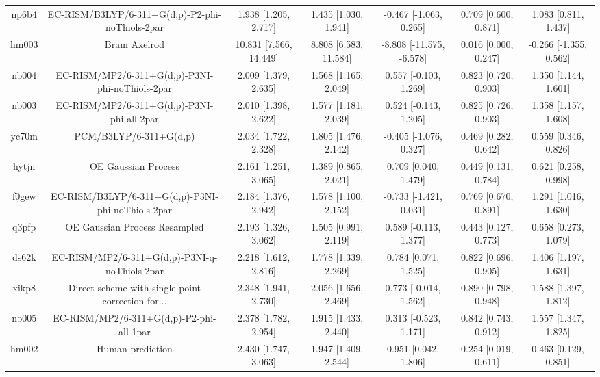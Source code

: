 \documentclass{article}
\begin{document}
\begin{center}
\begin{longtable}{|ccccccc|}
 np6b4 &    EC-RISM/B3LYP/6-311+G(d,p)-P2-phi-noThiols-2par &    1.938 [1.205, 2.717] &   1.435 [1.030, 1.941] &    -0.467 [-1.063, 0.265] &  0.709 [0.600, 0.871] &    1.083 [0.811, 1.437] \\
 hm003 &                                       Bram Axelrod &  10.831 [7.566, 14.449] &  8.808 [6.583, 11.584] &  -8.808 [-11.575, -6.578] &  0.016 [0.000, 0.247] &  -0.266 [-1.355, 0.562] \\
 nb004 &    EC-RISM/MP2/6-311+G(d,p)-P3NI-phi-noThiols-2par &    2.009 [1.379, 2.635] &   1.568 [1.165, 2.049] &     0.557 [-0.103, 1.269] &  0.823 [0.720, 0.903] &    1.350 [1.144, 1.601] \\
 nb003 &         EC-RISM/MP2/6-311+G(d,p)-P3NI-phi-all-2par &    2.010 [1.398, 2.622] &   1.577 [1.181, 2.039] &     0.524 [-0.143, 1.205] &  0.825 [0.726, 0.903] &    1.358 [1.157, 1.608] \\
 yc70m &                             PCM/B3LYP/6-311+G(d,p) &    2.034 [1.722, 2.328] &   1.805 [1.476, 2.142] &    -0.405 [-1.076, 0.327] &  0.469 [0.282, 0.642] &    0.559 [0.346, 0.826] \\
 hytjn &                                OE Gaussian Process &    2.161 [1.251, 3.065] &   1.389 [0.865, 2.021] &      0.709 [0.040, 1.479] &  0.449 [0.131, 0.784] &    0.621 [0.258, 0.998] \\
 f0gew &  EC-RISM/B3LYP/6-311+G(d,p)-P3NI-phi-noThiols-2par &    2.184 [1.376, 2.942] &   1.578 [1.100, 2.152] &    -0.733 [-1.421, 0.031] &  0.769 [0.670, 0.891] &    1.291 [1.016, 1.630] \\
 q3pfp &                      OE Gaussian Process Resampled &    2.193 [1.326, 3.062] &   1.505 [0.991, 2.119] &     0.589 [-0.113, 1.377] &  0.443 [0.127, 0.773] &    0.658 [0.273, 1.079] \\
 ds62k &      EC-RISM/MP2/6-311+G(d,p)-P3NI-q-noThiols-2par &    2.218 [1.612, 2.816] &   1.778 [1.339, 2.269] &      0.784 [0.071, 1.525] &  0.822 [0.696, 0.905] &    1.406 [1.197, 1.631] \\
 xikp8 &  Direct scheme with single point correction for... &    2.348 [1.941, 2.730] &   2.056 [1.656, 2.469] &     0.773 [-0.014, 1.562] &  0.890 [0.798, 0.948] &    1.588 [1.397, 1.812] \\
 nb005 &           EC-RISM/MP2/6-311+G(d,p)-P2-phi-all-1par &    2.378 [1.782, 2.954] &   1.915 [1.433, 2.440] &     0.313 [-0.523, 1.171] &  0.842 [0.743, 0.912] &    1.557 [1.347, 1.825] \\
 hm002 &                                   Human prediction &    2.430 [1.747, 3.063] &   1.947 [1.409, 2.544] &      0.951 [0.042, 1.806] &  0.254 [0.019, 0.611] &    0.463 [0.129, 0.851] \\

\end{longtable}
\end{center}
\end{document}
